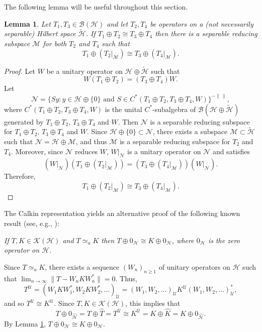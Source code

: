 \documentclass[11pt]{amsart}
\newtheorem{lemma}[theorem]{Lemma}
\theoremstyle{definition}
\numberwithin{equation}{section}
\begin{document}
The following lemma will be useful throughout this section.
\begin{lemma}\label{32}
Let $T_{1},T_{3}\in \mathcal{B(H)}$ and let $T_{2},T_{4}$ be operators on a (not necessarily separable) Hilbert space $\widetilde{\mathcal{H}}$. If $T_{1}\oplus T_{2}\cong
T_{3}\oplus T_{4}$ then there is a separable reducing subspace $\mathcal{M}$ for both $T_{2}$ and $T_{4}$ such that
\[T_{1}\oplus(T_{2}|_{\mathcal{M}})\cong T_{3}\oplus(T_{4}|_{\mathcal{M}}).\]
\end{lemma}
\begin{proof}
Let $W$ be a unitary operator on $\mathcal{H}\oplus\widetilde{\mathcal{H}}$ such that
\[W(T_{1}\oplus T_{2})=(T_{3}\oplus T_{4})W.\]
Let\[\mathcal{N}=\{Sy:y\in\mathcal{H}\oplus\{0\}\text{ and }S\in C^{*}(T_{1}\oplus T_{2},T_{3}\oplus T_{4},W)\}^{-\|\,\|},\]
where $C^{*}(T_{1}\oplus T_{2},T_{3}\oplus T_{4},W)$ is the unital $C^{*}$-subalgebra of $\mathcal{B}(\mathcal{H}\oplus\widetilde{\mathcal{H}})$ generated by $T_{1}\oplus
T_{2}$, $T_{3}\oplus T_{4}$ and $W$. Then $\mathcal{N}$ is a separable reducing subspace for $T_{1}\oplus T_{2}$, $T_{3}\oplus T_{4}$ and $W$. Since $\mathcal{H}\oplus\{0
\}\subset\mathcal{N}$, there exists a subspace $\mathcal{M}\subset\widetilde{\mathcal{H}}$ such that $\mathcal{N}=\mathcal{H}\oplus\mathcal{M}$, and thus $\mathcal{M}$ is
a separable reducing subspace for $T_{2}$ and $T_{4}$. Moreover, since $\mathcal{N}$ reduces $W$, $W|_{\mathcal{N}}$ is a unitary operator on $\mathcal{N}$ and satisfies
\[(W|_{\mathcal{N}})(T_{1}\oplus(T_{2}|_{\mathcal{M}}))=(T_{3}\oplus(T_{4}|_{\mathcal{M}}))(W|_{\mathcal{N}}).\]
Therefore,\[T_{1}\oplus(T_{2}|_{\mathcal{M}})\cong T_{3}\oplus(T_{4}|_{\mathcal{M}}).\]
\end{proof}
The Calkin representation yields an alternative proof of the following known result (see, e.g., \cite[Theorem 2.29]{Pearcy}):

{\it If $T,K\in\mathcal{K(H)}$ and $T\simeq_{a}K$ then $T\oplus 0_{\mathcal{H}}\cong K\oplus 0_{\mathcal{H}}$, where $0_{\mathcal{H}}$ is the zero operator on
$\mathcal{H}$.}

Since $T\simeq_{a}K$, there exists a sequence $(W_{n})_{n\geq 1}$ of unitary operators on $\mathcal{H}$ such that $\displaystyle\lim_{n\to\infty}\|T-W_{n}KW_{n}^{*}\|=0$.
Thus,
\[T^{\mathscr{U}}=(W_{1}KW_{1}^{*},W_{2}KW_{2}^{*},\ldots)_{\mathscr{U}}=(W_{1},W_{2},\ldots)_{\mathscr{U}}K^{\mathscr{U}}(W_{1},W_{2},\ldots)_{\mathscr{U}}^{*},\]
and so $T^{\mathscr{U}}\cong K^{\mathscr{U}}$. Since $T,K\in\mathcal{K(H)}$, this implies that
\[T\oplus 0_{\widehat{\mathcal{H}}}=T\oplus\widehat{T}=T^{\mathscr{U}}\cong K^{\mathscr{U}}=K\oplus\widehat{K}=K\oplus 0_{\widehat{\mathcal{H}}}.\]
By Lemma \ref{32}, $T\oplus 0_{\mathcal{H}}\cong K\oplus 0_{\mathcal{H}}$.
\end{document}
